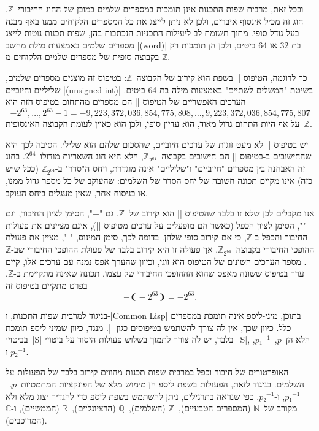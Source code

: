 ובכל זאת, מרבית שפות התכנות אינן תומכות במספרים שלמים במובן של החוג
החיבורי~$ℤ$. חוג זה מכיל אינסוף איברים, ולכן לא ניתן לייצג את כל המספרים
הלקוחים ממנו באף מבנה בעל גודל סופי. מתוך תשומת לב ליעילות התכניות הנכתבות בהן,
שפות תכנות נוטות לייצג מספרים שלמים באמצעות מילת מחשב \E|(word)| בת 32 או 64
ביטים, ולכן הן תומכות רק בקבוצה סופית של מספרים שלמים הלקוחים מ-$ℤ$.

כך לדוגמה, הטיפוס \E|| בשפת \Java הוא קירוב של הקבוצה~$ℤ$: בטיפוס זה מוצגים
מספרים שלמים, שליליים וחיוביים \E|(unsigned int)| בשיטת "המשלים לשתיים" באמצעות מילה בת
64 ביטים.
הערכים האפשריים של הטיפוס \E|| הם מספרים מהתחום
בטיפוס הזה הוא \begin{equation}
-2^{63},…,2^{63}-1=-9,223,372,036,854,775,808,…,9,223,372,036,854,775,807
\end{equation}
על אף היות התחום גדול מאוד, הוא עדיין סופי, ולכן הוא כאיין לעומת
הקבוצה האינסופית~$ℤ$.

יש בטיפוס \E|| לא מעט זוגות של ערכים חיוביים, שהסכום שלהם הוא שלילי.
הסיבה לכך היא שהחישובים ב-\Java בטיפוס \E|| הם חישובים
בקבוצה~$ℤ_{2^{64}}$, הלא היא חוג השאריות מודולו~$2^{64}$. בחוג זה האבחנה בין
מספרים "חיוביים" ו"שליליים" אינה מוגדרת, ויחס ה"סדר" ב-$ℤ_{2^{64}}$ (ככל שיש
כזה) אינו מקיים תכונה חשובה של יחס הסדר של השלמים: שהעוקב של כל מספר גדול ממנו,
או בניסוח אחר, שאין מעגלים ביחס העוקב.

אנו מקבלים לכן שלא זו בלבד שהטיפוס \E|| הוא קירוב של~$ℤ$, גם "\cc+",
הסימן לציון החיבור, וגם "\cc*", הסימן לציון הכפל \Java (כאשר הם מופעלים על
ערכים מטיפוס \E||), אינם מציינים את פעולות החיבור והכפל ב-$ℤ$, כי אם
קירוב סופי שלהן. בדומה לכך, סימן המינוס, "\cc-", מציין את פעולת ההופכי החיבורי
בקבוצה~$ℤ_{2^{64}}$, אך פעולה זו היא קירוב בלבד של פעולת ההופכי החיבורי שב-$ℤ$.
מספר הערכים השונים של הטיפוס  הוא זוגי, וכיוון שהערך אפס נמנה עם ערכים
אלו, קיים ערך בטיפוס ששונה מאפס שהוא הההופכי החיבורי של עצמו, תכונה שאינה
מתקיימת ב-$ℤ$, בפרט מתקיים בטיפוס זה
\begin{equation*}
-❨-2^{63}❩=-2^{63}.
\end{equation*}

בניגוד למרבית שפות התכנות, ו-\E|Common Lisp| בתוכן, מיני-ליספ אינה תומכת
במספרים כלל. כיוון שכך, אין לה צורך להשתמש בטיפוסים כגון \E||. מנגד,
כיוון שמיני-ליספ תומכת בביטויי~\E|S| בלבד, יש לה צורך לתמוך בשלוש פעולות היסוד
על ביטויי~\E|S|, הלא הן~$p$,~$p₁^{-1}$, ו-$p₂^{-1}$.

האופרטורים של חיבור וכפל במרבית שפות תכנות מהווים קירוב בלבד של הפעולות על
השלמים. בניגוד לזאת, הפעולות בשפת ליספ הן מימוש מלא של הפונקציות
המתמטיות~$p$,~$p₁^{-1}$, ו-$p₂^{-1}$. כפי שנראה בתרגילים, ניתן להשתמש בשפת
ליספ כדי להגדיר יצוג מלא ולא מקורב של~$ℕ$ (המספרים הטבעיים),~$ℤ$ (השלמים),~$ℚ$
(הרציונליים),~$ℝ$ (הממשיים), ו-$ℂ$ (המרוכבים).


